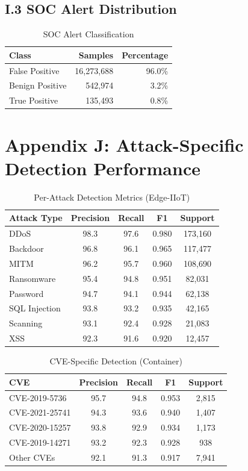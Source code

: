 \documentclass[12pt]{article}
\begin{document}
\subsection{I.3 SOC Alert Distribution}

\begin{table}[h]
\centering
\caption{SOC Alert Classification}
\begin{tabular}{lrr}
\toprule
\textbf{Class} & \textbf{Samples} & \textbf{Percentage} \\
\midrule
False Positive & 16,273,688 & 96.0\% \\
Benign Positive & 542,974 & 3.2\% \\
True Positive & 135,493 & 0.8\% \\
\bottomrule
\end{tabular}
\end{table}

\section{Appendix J: Attack-Specific Detection Performance}

\begin{table}[H]
\centering
\caption{Per-Attack Detection Metrics (Edge-IIoT)}
\begin{tabular}{lcccc}
\toprule
\textbf{Attack Type} & \textbf{Precision} & \textbf{Recall} & \textbf{F1} & \textbf{Support} \\
\midrule
DDoS & 98.3 & 97.6 & 0.980 & 173,160 \\
Backdoor & 96.8 & 96.1 & 0.965 & 117,477 \\
MITM & 96.2 & 95.7 & 0.960 & 108,690 \\
Ransomware & 95.4 & 94.8 & 0.951 & 82,031 \\
Password & 94.7 & 94.1 & 0.944 & 62,138 \\
SQL Injection & 93.8 & 93.2 & 0.935 & 42,165 \\
Scanning & 93.1 & 92.4 & 0.928 & 21,083 \\
XSS & 92.3 & 91.6 & 0.920 & 12,457 \\
\bottomrule
\end{tabular}
\end{table}

\begin{table}[H]
\centering
\caption{CVE-Specific Detection (Container)}
\begin{tabular}{lcccc}
\toprule
\textbf{CVE} & \textbf{Precision} & \textbf{Recall} & \textbf{F1} & \textbf{Support} \\
\midrule
CVE-2019-5736 & 95.7 & 94.8 & 0.953 & 2,815 \\
CVE-2021-25741 & 94.3 & 93.6 & 0.940 & 1,407 \\
CVE-2020-15257 & 93.8 & 92.9 & 0.934 & 1,173 \\
CVE-2019-14271 & 93.2 & 92.3 & 0.928 & 938 \\
Other CVEs & 92.1 & 91.3 & 0.917 & 7,941 \\
\bottomrule
\end{tabular}
\end{table}
\end{document}
